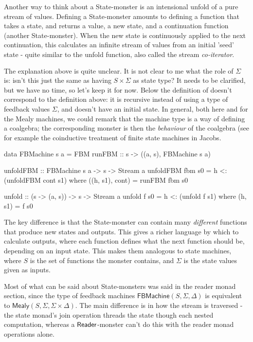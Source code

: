 Another way to think about a State-monster is an intensional unfold of a pure stream of values. Defining a State-monster amounts to defining a function that takes a state, and returns a value, a new state, and a continuation function (another State-monster). When the new state is continuously applied to the next continuation, this calculates an infinite stream of values from an initial 'seed' state - quite similar to the unfold function, also called the stream \emph{co-iterator}.

\begin{vcomment}
The explanation above is quite unclear.
It is not clear to me what the role of $\Sigma$ is: isn't this just the same as having $S\times \Sigma$ as state type?
 It needs to be clarified, but we have no time, so let's keep it for now. Below the definition of  doesn't correspond to the definition above: it is recursive instead of using a type of feedback values $\Sigma$, and doesn't have an initial state.
In general, both here and for the Mealy machines, we could remark that the machine type is a way of defining a coalgebra; the corresponding monster is then the {\em behaviour} of the coalgebra (see for example the coinductive treatment of finite state machines in Jacobs.
\end{vcomment}

\begin{haskell}
data FBMachine s a = FBM { runFBM :: s -> ((a, s), FBMachine s a) }

unfoldFBM :: FBMachine s a -> s -> Stream a
unfoldFBM fbm s0 = h <: (unfoldFBM cont s1)
		where ((h, s1), cont) = runFBM fbm s0

unfold :: (s -> (a, s)) -> s -> Stream a
unfold f s0 = h <: (unfold f s1)
		where (h, s1) = f s0
\end{haskell}

The key difference is that the State-monster can contain many \emph{different} functions that produce new states and outputs. This gives a richer language by which to calculate outputs, where each function defines what the next function should be, depending on an input state. This makes them analogous to state machines, where $S$ is the set of functions the monster contains, and $\Sigma$ is the state values given as inputs.

Most of what can be said about State-monsters was said in the reader monad section, since the type of feedback machines $\mathsf{FBMachine}(S,\Sigma,\Delta)$ is equivalent to $\mathsf{Mealy}(S,\Sigma,\Sigma \times \Delta)$. The main difference is in how the stream is traversed - the state monad's join operation threads the state though each nested computation, whereas a $\mathsf{Reader}$-monster can't do this with the reader monad operations alone.

